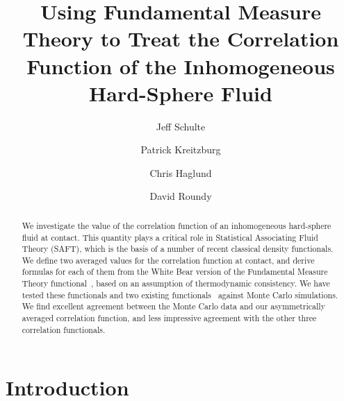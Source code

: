 \documentclass[letterpaper,twocolumn,amsmath,amssymb,jcp,10pt,aip]{revtex4-1}
\begin{document}
\title{Using Fundamental Measure Theory to Treat the Correlation
  Function of the Inhomogeneous Hard-Sphere Fluid}

\author{Jeff Schulte}
\author{Patrick Kreitzburg}
\author{Chris Haglund}
\author{David Roundy}


\begin{abstract}
  We investigate the value of the correlation function of an
  inhomogeneous hard-sphere fluid at contact.  This
  quantity plays a critical role in Statistical Associating Fluid
  Theory (SAFT), which is the basis of a number of recent classical
  density functionals.  We define two averaged values for the
  correlation function at contact, and derive formulas for each of
  them from the White Bear version of the Fundamental Measure Theory
  functional~\cite{roth2002whitebear}, based on an assumption of
  thermodynamic consistency. We have tested these functionals and two
  existing functionals~\cite{yu2002fmt-dft-inhomogeneous-associating,
    gross2009density} against Monte Carlo simulations.  We find
  excellent agreement between the Monte Carlo data and our
  asymmetrically averaged correlation function, and less impressive
  agreement with the other three correlation functionals.
\end{abstract}

\maketitle

\section{Introduction}

\newcommand\saftlocaldft{felipe2001examination, gloor2002saft,%
  gloor2004accurate, clark2006developing, gloor2007prediction,%
  kahl2008modified, gross2009density}
\newcommand\saftnonlocaldft{yu2002fmt-dft-inhomogeneous-associating,%
  fu2005vapor-liquid-dft,bryk2006density}
\end{document}
